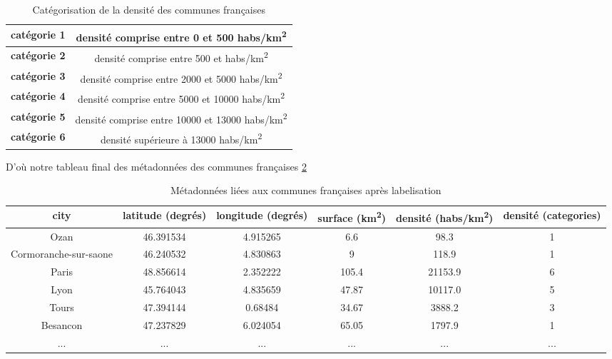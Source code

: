 \documentclass{book}
\begin{document}
\begin{table}[H]
\begin{center}
\begin{adjustbox}{max width=\textwidth}
{
\begin{tabular}{|c|c|}
    \hline 
    \textbf{catégorie 1} & densité comprise entre 0 et 500 habs/km\textsuperscript{2}\\
    \hline
    \textbf{catégorie 2} & densité comprise entre 500 et habs/km\textsuperscript{2}\\
    \hline
    \textbf{catégorie 3} & densité comprise entre 2000 et 5000 habs/km\textsuperscript{2}\\
    \hline
    \textbf{catégorie 4} & densité comprise entre 5000 et 10000 habs/km\textsuperscript{2}\\
    \hline
    \textbf{catégorie 5} & densité comprise entre 10000 et 13000 habs/km\textsuperscript{2}\\
    \hline
    \textbf{catégorie 6} & densité supérieure à 13000 habs/km\textsuperscript{2}\\
    \hline
\end{tabular}
}
\end{adjustbox}
\end{center}
\caption{Catégorisation de la densité des communes françaises}
\label{tab_meta_categorie}
\end{table}

D'où notre tableau final des métadonnées des communes françaises \ref{tab_meta_cat}

\begin{table}[H]
\begin{center}
\begin{adjustbox}{max width=\textwidth}
{
\begin{tabular}{|c|c|c|c|c|c|}
\hline 
city & latitude (degrés) & longitude (degrés) & surface (km\textsuperscript{2}) & densité (habs/km\textsuperscript{2}) & \textbf{densité (categories)}\\
\hline
Ozan & 46.391534 & 4.915265 & 6.6 & 98.3 & 1\\
\hline 
Cormoranche-sur-saone & 46.240532 & 4.830863 & 9 & 118.9 & 1\\
\hline 
Paris & 48.856614 & 2.352222 & 105.4 & 21153.9 & 6\\
\hline
Lyon & 45.764043 & 4.835659 & 47.87 & 10117.0 & 5\\
\hline
Tours & 47.394144 & 0.68484 & 34.67 & 3888.2 & 3\\
\hline
Besancon & 47.237829 & 6.024054 & 65.05 & 1797.9 & 1\\
\hline 
... & ... & ... & ... & ... & ...\\
\hline
\end{tabular}
}
\end{adjustbox}
\end{center}
\caption{Métadonnées liées aux communes françaises après labelisation}
\label{tab_meta_cat}
\end{table}
\end{document}
